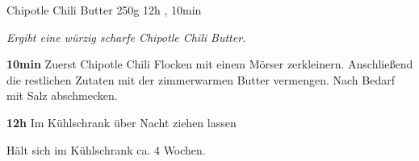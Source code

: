 \documentclass[../recipe-collections/cooking.tex]{subfiles}
\begin{document}
\begin{recipe}{Chipotle Chili Butter} {250g } {12h , 10min }

  \freeform{}\textit{Ergibt eine würzig scharfe Chipotle Chili Butter.}


  \textbf{10min}
  Zuerst Chipotle Chili Flocken mit einem Mörser zerkleinern.
  Anschließend die restlichen Zutaten mit der zimmerwarmen Butter vermengen.
  Nach Bedarf mit Salz abschmecken.

  \newstep{}\textbf{12h}
  Im Kühlschrank über Nacht ziehen lassen

  \freeform{}\hrulefill{}

  \freeform{}
  Hält sich im Kühlschrank ca. 4 Wochen.

\end{recipe}
\end{document}
